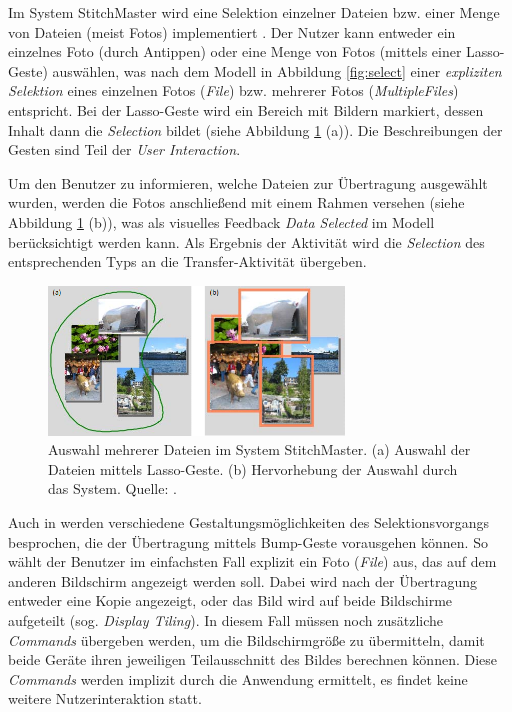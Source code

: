 Im System StitchMaster wird eine Selektion einzelner Dateien bzw. einer Menge von Dateien (meist Fotos) implementiert \citep{Hinckley2004}. Der Nutzer kann entweder ein einzelnes Foto (durch Antippen) oder eine Menge von Fotos (mittels einer Lasso-Geste) auswählen, was nach dem Modell in Abbildung \ref{fig:select} einer \textit{expliziten Selektion} eines einzelnen Fotos (\textit{File}) bzw. mehrerer Fotos (\textit{MultipleFiles}) entspricht. Bei der Lasso-Geste wird ein Bereich mit Bildern markiert, dessen Inhalt dann die \textit{Selection} bildet (siehe Abbildung \ref{fig:stitch_select} (a)). Die Beschreibungen der Gesten sind Teil der \textit{User Interaction}.

Um den Benutzer zu informieren, welche Dateien zur Übertragung ausgewählt wurden, werden die Fotos anschließend mit einem Rahmen versehen (siehe Abbildung \ref{fig:stitch_select} (b)), was als visuelles Feedback \textit{Data Selected} im Modell berücksichtigt werden kann. Als Ergebnis der Aktivität wird die \textit{Selection} des entsprechenden Typs an die Transfer-Aktivität übergeben.
\begin{figure}[h]
\centering
\includegraphics[width=0.7\textwidth]{bilder/stitch_select.png}
\caption{Auswahl mehrerer Dateien im System StitchMaster. (a) Auswahl der Dateien mittels Lasso-Geste. (b) Hervorhebung der Auswahl durch das System. Quelle: \citep{Hinckley2004}.}
\label{fig:stitch_select}
\end{figure}

Auch in \citep{Hinckley2003} werden verschiedene Gestaltungsmöglichkeiten des Selektionsvorgangs besprochen, die der Übertragung mittels Bump-Geste vorausgehen können. So wählt der Benutzer im einfachsten Fall explizit ein Foto (\textit{File}) aus, das auf dem anderen Bildschirm angezeigt werden soll. Dabei wird nach der Übertragung entweder eine Kopie angezeigt, oder das Bild wird auf beide Bildschirme aufgeteilt (sog. \textit{Display Tiling}). In diesem Fall müssen noch zusätzliche \textit{Commands} übergeben werden, um \zb die Bildschirmgröße zu übermitteln, damit beide Geräte ihren jeweiligen Teilausschnitt des Bildes berechnen können. Diese \textit{Commands} werden implizit durch die Anwendung ermittelt, es findet keine weitere Nutzerinteraktion statt.

